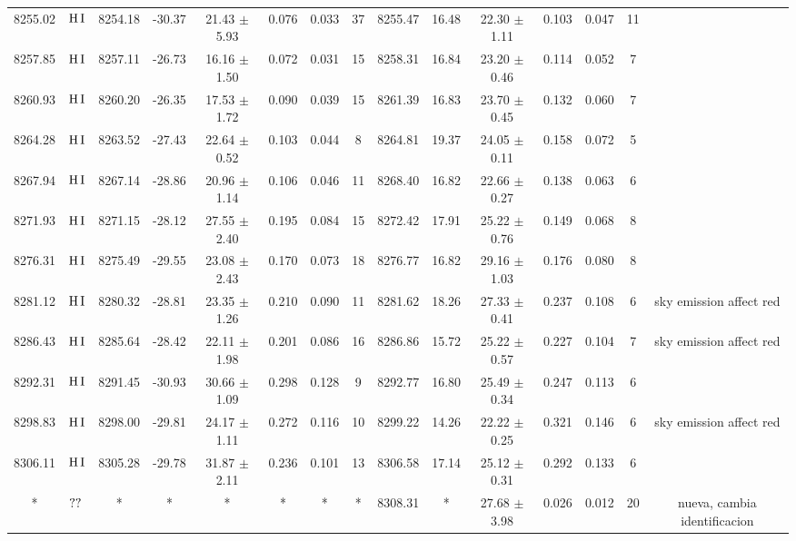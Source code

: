 \documentclass{article}
\begin{document}
\begin{table*}
\begin{adjustbox}{width=\textwidth}
\begin{tabular}{ccccccccccccccc}
8255.02 & $\mbox{H}\thinspace \mbox{I}$ & 8254.18 & -30.37 & 21.43 $\pm$ 5.93 & 0.076 & 0.033 & 37 & 8255.47 & 16.48 & 22.30 $\pm$ 1.11 & 0.103 & 0.047 & 11 &  \\
8257.85 & $\mbox{H}\thinspace \mbox{I}$ & 8257.11 & -26.73 & 16.16 $\pm$ 1.50 & 0.072 & 0.031 & 15 & 8258.31 & 16.84 & 23.20 $\pm$ 0.46 & 0.114 & 0.052 & 7 &  \\
8260.93 & $\mbox{H}\thinspace \mbox{I}$ & 8260.20 & -26.35 & 17.53 $\pm$ 1.72 & 0.090 & 0.039 & 15 & 8261.39 & 16.83 & 23.70 $\pm$ 0.45 & 0.132 & 0.060 & 7 &  \\
8264.28 & $\mbox{H}\thinspace \mbox{I}$ & 8263.52 & -27.43 & 22.64 $\pm$ 0.52 & 0.103 & 0.044 & 8 & 8264.81 & 19.37 & 24.05 $\pm$ 0.11 & 0.158 & 0.072 & 5 &  \\
8267.94 & $\mbox{H}\thinspace \mbox{I}$ & 8267.14 & -28.86 & 20.96 $\pm$ 1.14 & 0.106 & 0.046 & 11 & 8268.40 & 16.82 & 22.66 $\pm$ 0.27 & 0.138 & 0.063 & 6 &  \\
8271.93 & $\mbox{H}\thinspace \mbox{I}$ & 8271.15 & -28.12 & 27.55 $\pm$ 2.40 & 0.195 & 0.084 & 15 & 8272.42 & 17.91 & 25.22 $\pm$ 0.76 & 0.149 & 0.068 & 8 &  \\
8276.31 & $\mbox{H}\thinspace \mbox{I}$ & 8275.49 & -29.55 & 23.08 $\pm$ 2.43 & 0.170 & 0.073 & 18 & 8276.77 & 16.82 & 29.16 $\pm$ 1.03 & 0.176 & 0.080 & 8 &  \\
8281.12 & $\mbox{H}\thinspace \mbox{I}$ & 8280.32 & -28.81 & 23.35 $\pm$ 1.26 & 0.210 & 0.090 & 11 & 8281.62 & 18.26 & 27.33 $\pm$ 0.41 & 0.237 & 0.108 & 6 &  sky emission affect red \\
8286.43 & $\mbox{H}\thinspace \mbox{I}$ & 8285.64 & -28.42 & 22.11 $\pm$ 1.98 & 0.201 & 0.086 & 16 & 8286.86 & 15.72 & 25.22 $\pm$ 0.57 & 0.227 & 0.104 & 7 &  sky emission affect red \\
8292.31 & $\mbox{H}\thinspace \mbox{I}$ & 8291.45 & -30.93 & 30.66 $\pm$ 1.09 & 0.298 & 0.128 & 9 & 8292.77 & 16.80 & 25.49 $\pm$ 0.34 & 0.247 & 0.113 & 6 &  \\
8298.83 & $\mbox{H}\thinspace \mbox{I}$ & 8298.00 & -29.81 & 24.17 $\pm$ 1.11 & 0.272 & 0.116 & 10 & 8299.22 & 14.26 & 22.22 $\pm$ 0.25 & 0.321 & 0.146 & 6 &  sky emission affect red \\
8306.11 & $\mbox{H}\thinspace \mbox{I}$ & 8305.28 & -29.78 & 31.87 $\pm$ 2.11 & 0.236 & 0.101 & 13 & 8306.58 & 17.14 & 25.12 $\pm$ 0.31 & 0.292 & 0.133 & 6 &  \\
* & $\mbox{??}\thinspace \mbox{}$ & * & * & * & * & * & * & 8308.31 & * & 27.68 $\pm$ 3.98 & 0.026 & 0.012 & 20 &  nueva, cambia identificacion \\

\end{tabular}
\end{adjustbox}
\end{table*}
\end{document}
